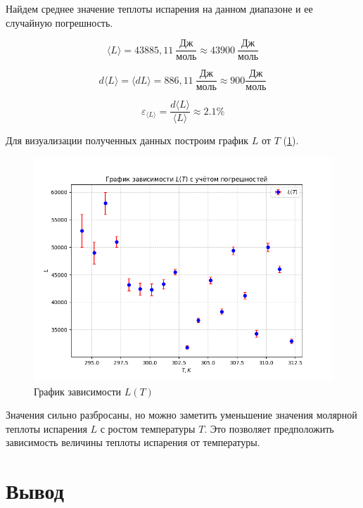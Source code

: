 \documentclass[a4paper,12pt]{article} %
\begin{document}
Найдем среднее значение теплоты испарения на данном диапазоне и ее случайную погрешность.

\begin{equation}
  \langle L \rangle = 43885,11\ \frac{\mbox{Дж}}{\mbox{моль}} \approx 43900\ \frac{\mbox{Дж}}{\mbox{моль}}
\end{equation}

\begin{equation}
  d\langle L \rangle = \langle dL \rangle = 886,11\ \frac{\mbox{Дж}}{\mbox{моль}} \approx 900 \frac{\mbox{Дж}}{\mbox{моль}}
\end{equation}

\begin{equation}
  \varepsilon_{\langle L \rangle} = \frac{d\langle L \rangle}{\langle L \rangle} \approx 2.1 \%
\end{equation}

Для визуализации полученных данных построим график $L$ от $T$ (\ref{fig:graph3}).

\begin{figure}[h]
  \centering
  \includegraphics[scale = 0.75]{graph3.png}
  \caption{График зависимости $L(T)$}
  \label{fig:graph3}
\end{figure}

Значения сильно разбросаны, но можно заметить уменьшение значения молярной теплоты испарения $L$ с ростом температуры $T$. 
Это позволяет предположить зависимость величины теплоты испарения от температуры.

\section{Вывод}
\end{document}
